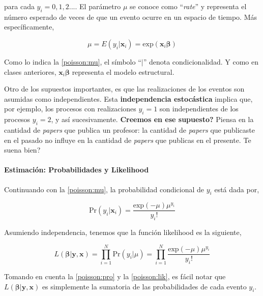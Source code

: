 \documentclass[onesided]{article}\usepackage[]{graphicx}\usepackage[]{color}
\begin{document}
para cada $y_{i}=0, 1, 2...$. El par\'ametro $\mu$ se conoce como ``\emph{rate}'' y representa el n\'umero esperado de veces de que un evento ocurre en un espacio de tiempo. M\'as espec\'ificamente,

\begin{equation}\label{poisson:mu}
\mu = E(y_{i}|\boldsymbol{x}_{i}) = \text{exp}(\boldsymbol{x}_{i}\boldsymbol{\beta})
\end{equation}

Como lo indica la \autoref{poisson:mu}, el s\'imbolo ``$|$'' denota condicionalidad. Y como en clases anteriores, $\boldsymbol{x}_{i}\boldsymbol{\beta}$ representa el modelo estructural.


Otro de los supuestos importantes, es que las realizaciones de los eventos son asumidas como independientes. Esta {\bf independencia estoc\'astica} implica que, por ejemplo, los procesos con realizaciones $y_{i}=1$ son independientes de los procesos $y_{i}=2$, y as\'i sucesivamente. {\bf Creemos en ese supuesto?} Piensa en la cantidad de \emph{papers} que publica un profesor: la cantidad de \emph{papers} que publicaste en el pasado no influye en la cantidad de \emph{papers} que publicas en el presente. {\color{red}Te suena bien?}

\paragraph{Estimaci\'on: Probabilidades y Likelihood} 

Continuando con la \autoref{poisson:mu}, la probabilidad condicional de $y_{i}$ est\'a dada por,


\begin{equation}\label{poisson:pro}
\text{Pr}(y_{i}|\boldsymbol{x}_{i}) = \frac{\text{exp}(-\mu)\mu^{y_{i}}}{y_{i}!}
\end{equation}

Asumiendo independencia, tenemos que la funci\'on likelihood es la siguiente,

\begin{equation}\label{poisson:lik}
L(\boldsymbol{\beta}|\boldsymbol{y}, \boldsymbol{x}) = \prod_{i=1}^{N}\text{Pr}(y_{i}|\mu)=\prod_{i=1}^{N}\frac{\text{exp}(-\mu)\mu^{y_{i}}}{y_{i}!}
\end{equation}

Tomando en cuenta la \autoref{poisson:pro} y la \autoref{poisson:lik}, es f\'acil notar que $L(\boldsymbol{\beta}|\boldsymbol{y}, \boldsymbol{x})$ es simplemente la sumatoria de las probabilidades de cada evento $y_{i}$.
\end{document}
